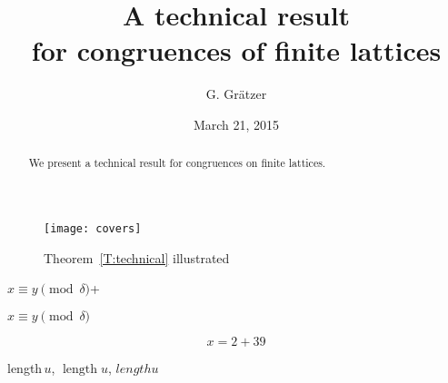 \documentclass{amsart}
\newcommand{\pdelta}{\pmod{\delta}}
\DeclareMathOperator{\length}{length}
\begin{document}
\title{A technical result\\ for congruences of finite lattices}
\author{G. Gr\"atzer}
\address{
    Department of Mathematics\\
    University of Manitoba\\
    Winnipeg, MB R3T 2N2\\
    Canada
}
\date{March 21, 2015}
\maketitle

\begin{abstract}
    We present a technical result for congruences on finite lattices.
\end{abstract}

\begin{figure}[hbt]
    \texttt{[image: covers]}
    \caption{Theorem~\ref{T:technical} illustrated}
    \label{F:Theorem}
\end{figure}

\clearpage

$x \equiv y \pmod{\delta}$+

$x \equiv y \pdelta$

\begin{equation}
    x = 2 + 39 \label{T:technical}
\end{equation}

\clearpage

length\,$u$, $\length u$, $length u$
\end{document}
